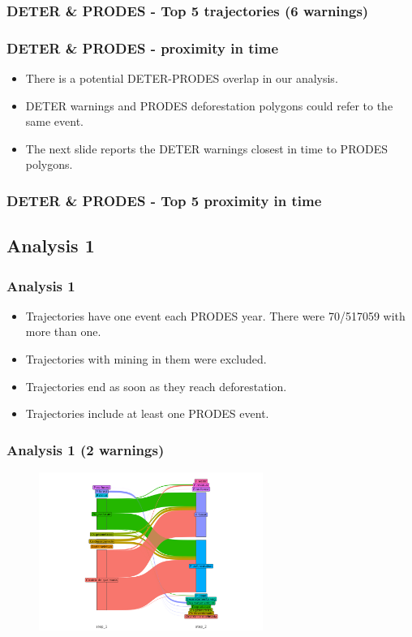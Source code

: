 \documentclass[aspectratio=169]{beamer}
\begin{document}
\begin{frame}[allowframebreaks]
    \frametitle{DETER \& PRODES - Top 5 trajectories (6 warnings)}
    
\end{frame}

\begin{frame}[allowframebreaks]
    \frametitle{DETER \& PRODES - proximity in time}
    \begin{itemize}
        \item There is a potential DETER-PRODES overlap in our analysis.
        \item DETER warnings and PRODES deforestation polygons could refer to
            the same event.
        \item The next slide reports the DETER warnings closest in 
            time to PRODES polygons.
    \end{itemize}
\end{frame}

\begin{frame}[allowframebreaks]
    \frametitle{DETER \& PRODES - Top 5 proximity in time}
    
\end{frame}



\subsection{Analysis 1}

\begin{frame}
    \frametitle{Analysis 1}
    \begin{itemize}
        \item Trajectories have one event each PRODES year. There were 
            70/517059 with more than one.
        \item Trajectories with mining in them were excluded.
        \item Trajectories end as soon as they reach deforestation.
        \item Trajectories include at least one PRODES event.
    \end{itemize}
\end{frame}

\begin{frame}
    \frametitle{Analysis 1 (2 warnings) }
    \begin{figure}[h] 
    \includegraphics[width=0.65\textwidth]{./figures/an1_plot_deter_prodes_subarea_trajectory_2.png}
    \end{figure}
\end{frame}
\end{document}
